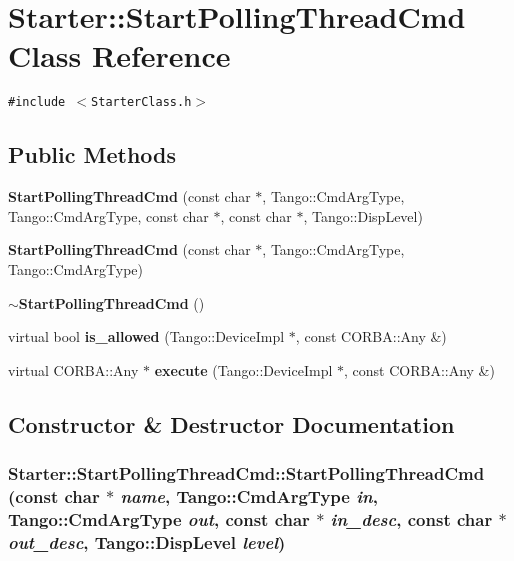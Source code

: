 \section{Starter::Start\-Polling\-Thread\-Cmd  Class Reference}
\label{classStarter_1_1StartPollingThreadCmd}
{\tt \#include $<$Starter\-Class.h$>$}

\subsection*{Public Methods}
\begin{CompactItemize}
\item 
{\bf Start\-Polling\-Thread\-Cmd} (const char $\ast$, Tango::Cmd\-Arg\-Type, Tango::Cmd\-Arg\-Type, const char $\ast$, const char $\ast$, Tango::Disp\-Level)
\item 
{\bf Start\-Polling\-Thread\-Cmd} (const char $\ast$, Tango::Cmd\-Arg\-Type, Tango::Cmd\-Arg\-Type)
\item 
{\bf $\sim$Start\-Polling\-Thread\-Cmd} ()
\item 
virtual bool {\bf is\_\-allowed} (Tango::Device\-Impl $\ast$, const CORBA::Any \&)
\item 
virtual CORBA::Any $\ast$ {\bf execute} (Tango::Device\-Impl $\ast$, const CORBA::Any \&)
\end{CompactItemize}


\subsection{Constructor \& Destructor Documentation}
\subsubsection{\setlength{\rightskip}{0pt plus 5cm}Starter::Start\-Polling\-Thread\-Cmd::Start\-Polling\-Thread\-Cmd (const char $\ast$ {\em name}, Tango::Cmd\-Arg\-Type {\em in}, Tango::Cmd\-Arg\-Type {\em out}, const char $\ast$ {\em in\_\-desc}, const char $\ast$ {\em out\_\-desc}, Tango::Disp\-Level {\em level})}\label{classStarter_1_1StartPollingThreadCmd_a0}


